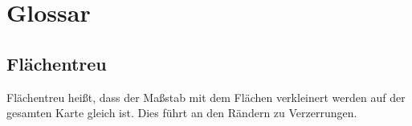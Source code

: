 \section*{Glossar}
\subsection*{Flächentreu}
Flächentreu heißt, dass der Maßstab mit dem Flächen verkleinert werden auf der gesamten Karte gleich ist. Dies führt an den Rändern zu Verzerrungen.